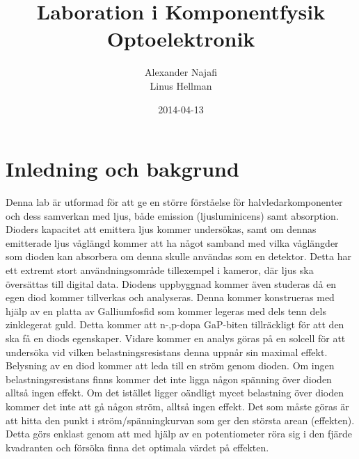 \documentclass[a4paper]{article}
\title{Laboration i Komponentfysik\\ Optoelektronik}
\author{Alexander Najafi \\ Linus Hellman}
\date{2014-04-13}
\begin{document}
\maketitle
\thispagestyle{empty}
\newpage

\tableofcontents
\newpage

\section{Inledning och bakgrund}

Denna lab är utformad för att ge en större förståelse för halvledarkomponenter och dess samverkan med ljus, både emission (ljusluminicens) samt absorption. Dioders kapacitet att emittera ljus kommer undersökas, samt om dennas emitterade ljus våglängd kommer att ha något samband med vilka våglängder som dioden kan absorbera om denna skulle användas som en detektor. Detta har ett extremt stort användningsområde tillexempel i kameror, där ljus ska översättas till digital data. Diodens uppbyggnad kommer även studeras då en egen diod kommer tillverkas och analyseras. Denna kommer konstrueras med hjälp av en platta av Galliumfosfid som kommer legeras med dels tenn dels zinklegerat guld. Detta kommer att n-,p-dopa GaP-biten tillräckligt för att den ska få en diods egenskaper. Vidare kommer en analys göras på en solcell för att undersöka vid vilken belastningsresistans denna uppnår sin maximal effekt. Belysning av en diod kommer att leda till en ström genom dioden. Om ingen belastningsresistans finns kommer det inte ligga någon spänning över dioden alltså ingen effekt. Om det istället ligger oändligt mycet belastning över dioden kommer det inte att gå någon ström, alltså ingen effekt. Det som måste göras är att hitta den punkt i ström/spänningkurvan som ger den största arean (effekten). Detta görs enklast genom att med hjälp av en potentiometer röra sig i den fjärde kvadranten och försöka finna det optimala värdet på effekten.
\end{document}

